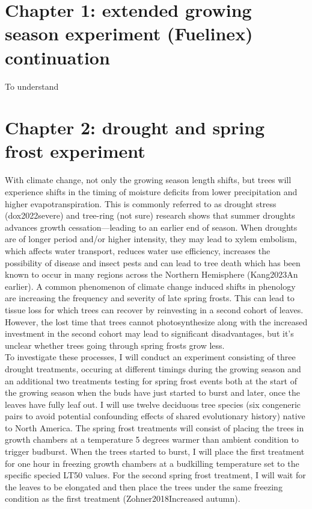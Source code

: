 \documentclass{article}
\begin{document}
\section*{Chapter 1: extended growing season experiment (Fuelinex) continuation}
To understand 

\section*{Chapter 2: drought and spring frost experiment}
With climate change, not only the growing season length shifts, but trees will experience shifts in the timing of moisture deficits from lower precipitation and higher evapotranspiration. This is commonly referred to as drought stress (dox2022severe) and tree-ring (not sure) research shows that summer droughts advances growth cessation---leading to an earlier end of season. When droughts are of longer period and/or higher intensity, they may lead to xylem embolism, which affects water transport, reduces water use efficiency, increases the possibility of disease and insect pests and can lead to tree death which has been known to occur in many regions across the Northern Hemisphere (Kang2023An earlier). A common phenomenon of climate change induced shifts in phenology are increasing the frequency and severity of late spring frosts. This can lead to tissue loss for which trees can recover by reinvesting in a second cohort of leaves. However, the lost time that trees cannot photosynthesize along with the increased investment in the second cohort may lead to significant disadvantages, but it's unclear whether trees going through spring frosts grow less. \\
To investigate these processes, I will conduct an experiment consisting of three drought treatments, occuring at different timings during the growing season and an additional two treatments testing for spring frost events both at the start of the growing season when the buds have just started to burst and later, once the leaves have fully leaf out. I will use twelve deciduous tree species (six congeneric pairs to avoid potential confounding effects of shared evolutionary history) native to North America. The spring frost treatments will consist of placing the trees in growth chambers at a temperature 5 degrees warmer than ambient condition to trigger budburst. When the trees started to burst, I will place the first treatment for one hour in freezing growth chambers at a budkilling temperature set to the specific specied LT50 values. For the second spring frost treatment, I will wait for the leaves to be elongated and then place the trees under the same freezing condition as the first treatment (Zohner2018Increased autumn).\\
\end{document}
